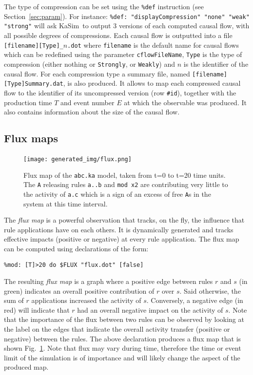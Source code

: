 \documentclass[11pt]{book}
\def\KaSim{\textsf{KaSim}}
\def\ttt#1{\texttt{#1}}
\begin{document}
The type of compression can be set using the \texttt{\%def} instruction (see Section~\ref{sec:param}). For instance:
\lstinline[language=kappa]!%def: "displayCompression" "none" "weak" "strong"!
will ask \KaSim~to output 3 versions of each computed causal flow, with all possible degrees of compressions. Each causal flow is outputted into a file \texttt{[filename][Type]\_$n$.dot} where \texttt{filename} is the default name for causal flows which can be redefined using the parameter \texttt{cflowFileName}, \texttt{Type} is the type of compression (either nothing or \texttt{Strongly}, or \texttt{Weakly}) and $n$ is the identifier of the causal flow. For each compression type a summary file, named \texttt{[filename][Type]Summary.dat}, is also produced. It allows to map each compressed causal flow to the identifier of its uncompressed version (row \texttt{\#id}), together with the production time $T$ and event number $E$ at which the observable was produced. It also contains information about the size of the causal flow.

\subsection{Flux maps}

\begin{figure}[p] %
   \centering
\texttt{[image: generated\_img/flux.png]}
   \caption{Flux map of the \ttt{abc.ka} model, taken from t=0 to t=20 time units. The \ttt{A} releasing rules \ttt{a..b} and \ttt{mod x2} are contributing very little to the activity of \ttt{a.c} which is a sign of an excess of free \ttt{A}s in the system at this time interval.}
   \label{fig:flux}
\end{figure}
The \emph{flux map} is a powerful observation that tracks, on the fly, the influence that rule applications have on each others. It is dynamically generated and tracks effective impacts (positive or negative) at every rule application. The flux map can be computed using declarations of the form:
\begin{lstlisting}[language=kappa]
%mod: [true] do $FLUX "flux.dot" [true]
%mod: [T]>20 do $FLUX "flux.dot" [false]
\end{lstlisting}
The resulting \emph{flux map} is a graph where a positive edge between rules $r$ and $s$ (in green) indicates an overall positive contribution of $r$ over $s$. Said otherwise, the sum of $r$ applications increased the activity of $s$. Conversely, a negative edge (in red) will indicate that $r$ had an overall negative impact on the activity of $s$. Note that the importance of the flux between two rules can be observed by looking at the label on the edges that indicate the overall activity transfer (positive or negative) between the rules. The above declaration produces a flux map that is shown Fig.~\ref{fig:flux}. Note that flux may vary during time, therefore the time or event limit of the simulation is of importance and will likely change the aspect of the produced map.
\end{document}
